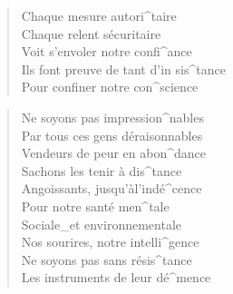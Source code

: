 \documentclass{leadsheet}
\begin{document}
\begin{song}
\begin{multicols}{2}
\begin{verse}
    Chaque mesure autori^taire \\
    Chaque relent sécuritaire \\
    Voit s'envoler notre confi^ance \\
    Ils font preuve de tant d'in sis^tance \\
    Pour confiner notre con^science \\
  \end{verse}
  \begin{chorus}[after-label=]\end{chorus}
  \begin{verse}
    Ne soyons pas impression^nables \\
    Par tous ces gens déraisonnables \\
    Vendeurs de peur en abon^dance \\
    Sachons les tenir à dis^tance \\

    Angoissants, jusqu'àl'indé^cence \\
    Pour notre santé men^tale \\
    Sociale\_et environnementale \\ 
    Nos sourires, notre intelli^gence \\
    Ne soyons pas sans résis^tance \\
    Les instruments de leur dé^mence \\
  \end{verse}
  \begin{chorus}[after-label=]\end{chorus}
  \end{multicols}
\end{song}
\end{document}
